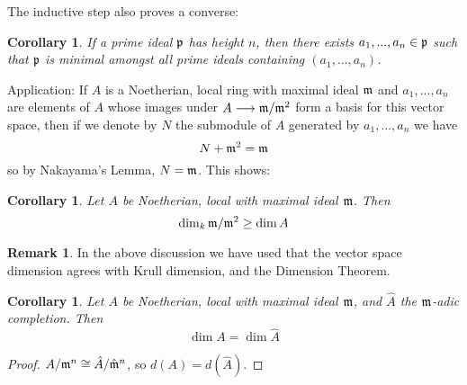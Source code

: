 \documentclass[12pt]{article}
\theoremstyle{plain}
\newtheorem{cor}[thm]{Corollary}
\theoremstyle{definition}
\newtheorem{remark}[thm]{Remark}
\newcommand{\lto}{\longrightarrow}
\begin{document}
The inductive step also proves a converse:
\begin{cor}
If a prime ideal $\frak{p}$ has height $n$, then there exists $a_1,...,a_n \in \frak{p}$ such that $\frak{p}$ is minimal amongst all prime ideals containing $(a_1,...,a_n)$.
\end{cor}
Application: If $A$ is a Noetherian, local ring with maximal ideal $\frak{m}$ and $a_1,...,a_n$ are elements of $A$ whose images under $A \lto \frak{m}/\frak{m}^2$ form a basis for this vector space, then if we denote by $N$ the submodule of $A$ generated by $a_1,...,a_n$ we have
\[N + \frak{m}^2 = \frak{m}\]
so by Nakayama's Lemma, $N = \frak{m}$. This shows:
\begin{cor}
Let $A$ be Noetherian, local with maximal ideal $\frak{m}$. Then
\[\operatorname{dim}_k\frak{m}/\frak{m}^2 \geq \operatorname{dim}A\]
\end{cor}
\begin{remark}
In the above discussion we have used that the vector space dimension agrees with Krull dimension, and the Dimension Theorem.
\end{remark}
\begin{cor}
Let $A$ be Noetherian, local with maximal ideal $\frak{m}$, and $\hat{A}$ the $\frak{m}$-adic completion. Then
\[\operatorname{dim}A = \operatorname{dim}\hat{A}\]
\end{cor}
\begin{proof}
$A/\frak{m}^n \cong \hat{A}/\hat{\frak{m}}^n$, so $d(A) = d(\hat{A})$.
\end{proof}
\end{document}
